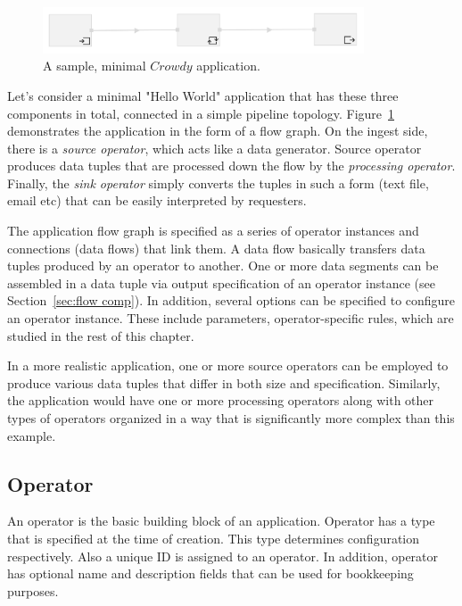 \begin{figure}[ht]
	\centering
	\includegraphics[width=0.85\textwidth]{figures/helloworld.png}
	\caption{A sample, minimal $Crowdy$ application.}
	\label{fig:hello world}
\end{figure}

Let's consider a minimal "Hello World" application that has these three components 
in total, connected in a simple pipeline topology. Figure~\ref{fig:hello world} demonstrates 
the application in the form of a flow graph. On the ingest side, there is a 
\textit{source operator}, which acts like a data generator. Source operator produces 
data tuples that are processed down the flow by the 
\textit{processing operator}. Finally, the \textit{sink operator} simply converts the tuples 
in such a form (text file, email etc) that can be easily interpreted by requesters.

The application flow graph is specified as a series of operator instances and connections 
(data flows) that link them. A data flow basically transfers data tuples 
produced by an operator to another. One or more data segments can be assembled in a 
data tuple via output specification of an operator instance (see Section~\ref{sec:flow comp}). 
In addition, several options can be specified to configure an operator instance. These 
include parameters, operator-specific rules, which are studied in the rest of this chapter.

In a more realistic application, one or more source operators can be employed to produce 
various data tuples that differ in both size and specification. Similarly, the application would 
have one or more processing operators along with other types of operators organized in a way 
that is significantly more complex than this example.

\subsection{Operator}
\label{sec:operator}
An operator is the basic building block of an application. Operator has a type that is 
specified at the time of creation. This type determines configuration respectively. Also a 
unique ID is assigned to an operator. In addition, operator has optional name and 
description fields that can be used for bookkeeping purposes.

